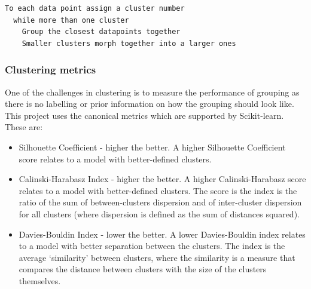 \begin{lstlisting}[caption={Agglomerative hierarchical clustering pseudocode, style=\small}, label={code:agg_clustering}]
  To each data point assign a cluster number
  while more than one cluster
    Group the closest datapoints together 
    Smaller clusters morph together into a larger ones
\end{lstlisting} 

\subsubsection*{Clustering metrics} \label{s:lit:clustering_metrics}

One of the challenges in clustering is to measure the performance of grouping as there is no labelling or prior information on how the grouping should look like. This project uses the canonical metrics which are supported by Scikit-learn\cite{Pedregosa2011-ts,Scikit-learn_undated-ax}. These are:
\begin{itemize}
  \item Silhouette Coefficient - higher the better. A higher Silhouette Coefficient score relates to a model with better-defined clusters. 
  \item Calinski-Harabasz Index - higher the better. A higher Calinski-Harabasz score relates to a model with better-defined clusters.  The score is the index is the ratio of the sum of between-clusters dispersion and of inter-cluster dispersion for all clusters (where dispersion is defined as the sum of distances squared).
  \item Davies-Bouldin Index - lower the better. A lower Davies-Bouldin index relates to a model with better separation between the clusters. The index is the average ‘similarity’ between clusters, where the similarity is a measure that compares the distance between clusters with the size of the clusters themselves.
\end{itemize}


